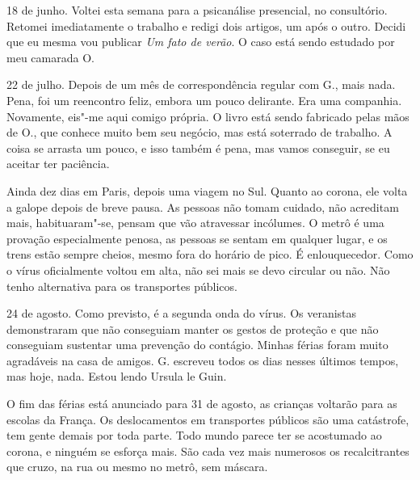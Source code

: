 18 de junho. Voltei esta semana para a psicanálise presencial, no
consultório. Retomei imediatamente o trabalho e redigi dois artigos, um
após o outro. Decidi que eu mesma vou publicar \emph{Um fato de verão}.
O caso está sendo estudado por meu camarada O.

22 de julho. Depois de um mês de correspondência regular com G., mais
nada. Pena, foi um reencontro feliz, embora um pouco delirante. Era uma
companhia. Novamente, eis"-me aqui comigo própria. O livro está sendo
fabricado pelas mãos de O., que conhece muito bem seu negócio, mas está
soterrado de trabalho. A coisa se arrasta um pouco, e isso também é
pena, mas vamos conseguir, se eu aceitar ter paciência.

Ainda dez dias em Paris, depois uma viagem no Sul. Quanto ao corona, ele
volta a galope depois de breve pausa. As pessoas não tomam cuidado, não
acreditam mais, habituaram"-se, pensam que vão atravessar incólumes. O
metrô é uma provação especialmente penosa, as pessoas se sentam em
qualquer lugar, e os trens estão sempre cheios, mesmo fora do horário de
pico. É enlouquecedor. Como o vírus oficialmente voltou em alta, não sei
mais se devo circular ou não. Não tenho alternativa para os transportes
públicos.

24 de agosto. Como previsto, é a segunda onda do vírus. Os veranistas
demonstraram que não conseguiam manter os gestos de proteção e que não
conseguiam sustentar uma prevenção do contágio. Minhas férias foram
muito agradáveis na casa de amigos. G. escreveu todos os dias nesses
últimos tempos, mas hoje, nada. Estou lendo Ursula le Guin.

O fim das férias está anunciado para 31 de agosto, as crianças voltarão
para as escolas da França. Os deslocamentos em transportes públicos são
uma catástrofe, tem gente demais por toda parte. Todo mundo parece ter
se acostumado ao corona, e ninguém se esforça mais. São cada vez mais
numerosos os recalcitrantes que cruzo, na rua ou mesmo no metrô, sem
máscara.

